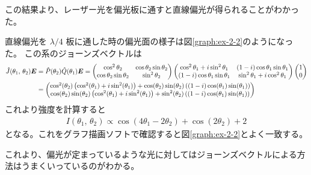 \documentclass[9pt,dvipdfmx,a4paper]{jsarticle}
\begin{document}
この結果より、レーザー光を偏光板に通すと直線偏光が得られることがわかった。

直線偏光を \(\lambda/4\) 板に通した時の偏光面の様子は図\ref{graph:ex-2-2}のようになった。
この系のジョーンズベクトルは
\begin{align}
    \hat{J}(\theta_1,\,\theta_2)\vb*{E} &= \hat{P}(\theta_2)\hat{Q}(\theta_1)\vb*{E}=
    \begin{pmatrix}
        \cos^2\theta_2 & \cos\theta_2\sin\theta_2\\
        \cos\theta_2\sin\theta_2 & \sin^2\theta_2
    \end{pmatrix}
    \begin{pmatrix}
        \cos^2\theta_1+i\sin^2\theta_1 & (1-i)\cos\theta_1\sin\theta_1\\
        (1-i)\cos\theta_1\sin\theta_1 & \sin^2\theta_1 + i \cos^2\theta_1
    \end{pmatrix}
    \begin{pmatrix}
        1\\0
    \end{pmatrix}\notag\\
    &=\begin{pmatrix}
        \cos^2(\theta_2) \left( \cos^2(\theta_1) + i \sin^2(\theta_1) \right) + \cos(\theta_2) \sin(\theta_2) \left( (1 - i) \cos(\theta_1) \sin(\theta_1) \right) \\
        \cos(\theta_2) \sin(\theta_2) \left( \cos^2(\theta_1) + i \sin^2(\theta_1) \right) + \sin^2(\theta_2) \left( (1 - i) \cos(\theta_1) \sin(\theta_1) \right)
    \end{pmatrix}
\end{align}
これより強度を計算すると
\begin{align}
    I(\theta_1,\,\theta_2) \propto \cos(4\theta_1-2\theta_2)+\cos(2\theta_2)+2
\end{align}
となる。これをグラフ描画ソフトで確認すると図\ref{graph:ex-2-2}とよく一致する。

これより、偏光が定まっているような光に対してはジョーンズベクトルによる方法はうまくいっているのがわかる。
\end{document}

